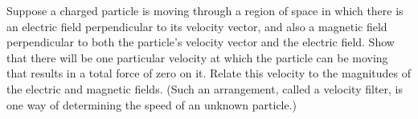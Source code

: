         Suppose a charged particle is moving through a
        region of space in which there is an electric field
        perpendicular to its velocity vector, and also a magnetic
        field perpendicular to both the particle's velocity vector
        and the electric field.  Show that there will be one
        particular velocity at which the particle can be moving that
        results in a total force of zero on it.  Relate this
        velocity to the magnitudes of the electric and magnetic
        fields.  (Such an arrangement, called a velocity filter, is
        one way of determining the speed of an unknown particle.)
